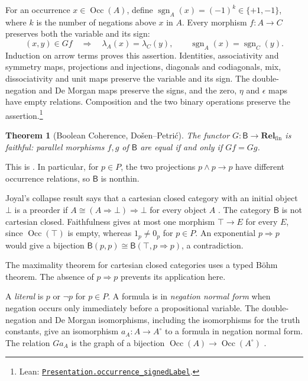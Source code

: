 \documentclass[11pt]{article}
\newtheorem{theorem}{Theorem}[section]
\newcommand{\B}{\mathsf B}
\newcommand{\Occ}{\operatorname{Occ}}
\newcommand{\Rel}{\mathbf{Rel}_{\mathrm{fin}}}
\begin{document}
For an occurrence $x\in\Occ(A)$, define
$\operatorname{sgn}_A(x)=(-1)^k\in\{+1,-1\}$, where $k$ is the
number of negations above $x$ in $A$. Every morphism $f:A\to C$
preserves both the variable and its sign:
\[
 (x,y)\in Gf\quad\Longrightarrow\quad
 \lambda_A(x)=\lambda_C(y),\qquad
 \operatorname{sgn}_A(x)=\operatorname{sgn}_C(y).
\]
Induction on arrow terms proves this assertion. Identities,
associativity and symmetry maps, projections and injections,
diagonals and codiagonals, mix, dissociativity and unit maps
preserve the variable and its sign. The double-negation and
De Morgan maps preserve the signs, and the zero,
$\eta$ and $\epsilon$ maps have empty relations. Composition and
the two binary operations preserve the assertion.\footnote{\raggedright Lean:
\href{https://github.com/flengyel/Dosen-Petric-Maximality/blob/dosen-petric-v25-palomar-v3/DosenPetric/PresentationSignedLabels.lean\#L73}{\texttt{Presentation.\allowbreak{}occurrence\_signedLabel}}.}

\begin{theorem}[Boolean Coherence, Do\v{s}en--Petri\'c]
\label{thm:coherence}
The functor $G:\B\to\Rel$ is faithful: parallel morphisms $f,g$ of
$\B$ are equal if and only if $Gf=Gg$.
\end{theorem}

This is \cite[\S14.2, p.~321]{DP}. In particular, for $p\in P$, the
two projections $p\wedge p\to p$ have different occurrence
relations, so $\B$ is nonthin.

Joyal's collapse result says that a cartesian closed category with
an initial object $\bot$ is a preorder if
$A\cong(A\Rightarrow\bot)\Rightarrow\bot$ for every object $A$
\cite[\S14.3, p.~324]{DP}.
The category $\B$ is not cartesian closed. Faithfulness gives at most
one morphism $\top\to E$ for every $E$, since $\Occ(\top)$ is empty,
whereas $1_p\ne0_p$ for $p\in P$. An exponential $p\Rightarrow p$
would give a bijection $\B(p,p)\cong\B(\top,p\Rightarrow p)$,
a contradiction.

The maximality theorem for cartesian closed categories
\cite[\S11]{DPCCC} uses a typed B\"ohm theorem.
The absence of $p\Rightarrow p$ prevents its application here.

A \emph{literal} is $p$ or $\neg p$ for $p\in P$.
A formula is in \emph{negation normal form} when negation occurs only
immediately before a propositional variable. The double-negation and
De Morgan isomorphisms, including the isomorphisms for the truth
constants, give an isomorphism $a_A:A\to A^\circ$ to a formula in
negation normal form. The relation $Ga_A$ is the graph of a bijection
$\Occ(A)\to\Occ(A^\circ)$
\cite[\S14.1, pp.~313--315]{DP}.
\end{document}
